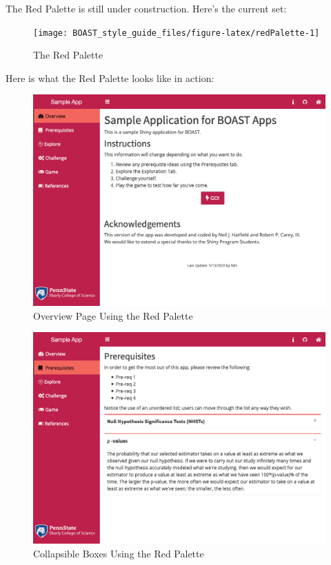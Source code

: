 \documentclass[
]{book}
\begin{document}
The Red Palette is still under construction. Here's the current set:

\begin{figure}

{\centering \texttt{[image: BOAST\_style\_guide\_files/figure-latex/redPalette-1]} 

}

\caption{The Red Palette}\label{fig:redPalette}
\end{figure}

Here is what the Red Palette looks like in action:

\begin{figure}

{\centering \includegraphics[width=14in]{images/redOverview} 

}

\caption{Overview Page Using the Red Palette}\label{fig:redAction1}
\end{figure}

\begin{figure}

{\centering \includegraphics[width=14in]{images/redCollapse} 

}

\caption{Collapsible Boxes Using the Red Palette}\label{fig:redAction2}
\end{figure}
\end{document}
